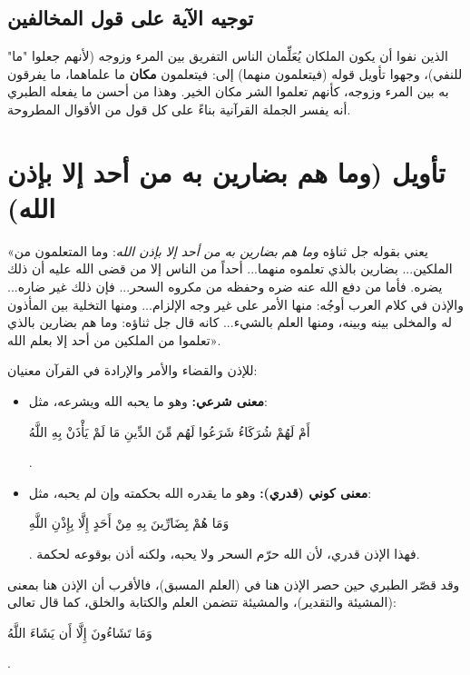 \subsection{توجيه الآية على قول المخالفين}
الذين نفوا أن يكون الملكان يُعَلِّمان الناس التفريق بين المرء وزوجه (لأنهم جعلوا "ما" للنفي)، وجهوا تأويل قوله (فيتعلمون منهما) إلى: فيتعلمون \textbf{مكان} ما علماهما، ما يفرقون به بين المرء وزوجه، كأنهم تعلموا الشر مكان الخير.
وهذا من أحسن ما يفعله الطبري أنه يفسر الجملة القرآنية بناءً على كل قول من الأقوال المطروحة.

\separator

\section{تأويل (وما هم بضارين به من أحد إلا بإذن الله)}
 «يعني بقوله جل ثناؤه \textit{وما هم بضارين به من أحد إلا بإذن الله}: وما المتعلمون من الملكين... بضارين بالذي تعلموه منهما... أحداً من الناس إلا من قضى الله عليه أن ذلك يضره. فأما من دفع الله عنه ضره وحفظه من مكروه السحر... فإن ذلك غير ضاره... والإذن في كلام العرب أوجُه: منها الأمر على غير وجه الإلزام... ومنها التخلية بين المأذون له والمخلى بينه وبينه، ومنها العلم بالشيء... كانه قال جل ثناؤه: وما هم بضارين بالذي تعلموا من الملكين من أحد إلا بعلم الله».

\begin{fawaid}
للإذن والقضاء والأمر والإرادة في القرآن معنيان:
\begin{itemize}
    \item \textbf{معنى شرعي:} وهو ما يحبه الله ويشرعه، مثل: \begin{ayah}أَمْ لَهُمْ شُرَكَاءُ شَرَعُوا لَهُم مِّنَ الدِّينِ مَا لَمْ يَأْذَنْ بِهِ اللَّهُ\end{ayah}.
    \item \textbf{معنى كوني (قدري):} وهو ما يقدره الله بحكمته وإن لم يحبه، مثل: \begin{ayah}وَمَا هُمْ بِضَارِّينَ بِهِ مِنْ أَحَدٍ إِلَّا بِإِذْنِ اللَّهِ\end{ayah}. فهذا الإذن قدري، لأن الله حرّم السحر ولا يحبه، ولكنه أذن بوقوعه لحكمة.
\end{itemize}
وقد قصّر الطبري حين حصر الإذن هنا في (العلم المسبق)، فالأقرب أن الإذن هنا بمعنى (المشيئة والتقدير)، والمشيئة تتضمن العلم والكتابة والخلق، كما قال تعالى: \begin{ayah}وَمَا تَشَاءُونَ إِلَّا أَن يَشَاءَ اللَّهُ\end{ayah}.
\end{fawaid}

